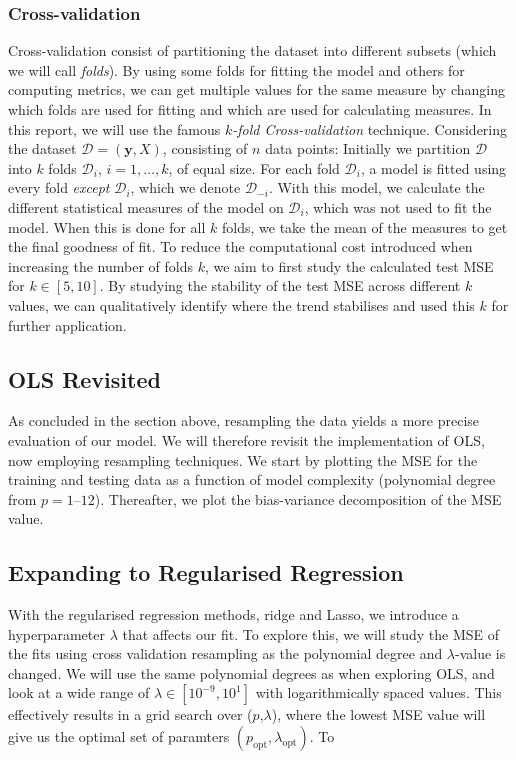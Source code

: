 \documentclass[twocolumn,english,notitlepage]{article}
\renewcommand{\vec}[1]{\boldsymbol{#1}}
\newcommand{\msub}[2]{\ensuremath{{#1}_\text{#2}}}
\begin{document}
        \subsubsection*{Cross-validation}
            Cross-validation consist of partitioning the dataset into different subsets (which we will call \textit{folds}). By using some folds for fitting the model and others for computing metrics, we can get multiple values for the same measure by changing which folds are used for fitting and which are used for calculating measures. 
            \newline\newline
            In this report, we will use the famous \textit{$k$-fold Cross-validation} technique. Considering the dataset $\mathcal{D} = (\vec{y}, X)$, consisting of $n$ data points: Initially we partition $\mathcal{D}$ into $k$ folds $\mathcal{D}_i$, $i = 1, \ldots , k$, of equal size. For each fold $\mathcal{D}_i$, a model is fitted using every fold \textit{except} $\mathcal{D}_i$, which we denote $\mathcal{D}_{-i}$. With this model, we calculate the different statistical measures of the model on $\mathcal{D}_i$, which was not used to fit the model. When this is done for all $k$ folds, we take the mean of the measures to get the final goodness of fit. 
            \newline\newline
            To reduce the computational cost introduced when increasing the number of folds $k$, we aim to first study the calculated test MSE for $k \in [5,10]$. By studying the stability of the test MSE across different $k$ values, we can qualitatively identify where the trend stabilises and used this $k$ for further application.   

    \subsection{OLS Revisited}
        As concluded in the section above, resampling the data yields a more precise evaluation of our model. We will therefore revisit the implementation of OLS, now employing resampling techniques. We start by plotting the MSE for the training and testing data as a function of model complexity (polynomial degree from $p=1\text{--}12$). Thereafter, we plot the bias-variance decomposition of the MSE value.  


    
    \subsection{Expanding to Regularised Regression}
        With the regularised regression methods, ridge and Lasso, we introduce a hyperparameter $\lambda$ that affects our fit. To explore this, we will study the MSE of the fits using cross validation resampling as the polynomial degree and $\lambda$-value is changed. We will use the same polynomial degrees as when exploring OLS, and look at a wide range of $\lambda \in [10^{-9}, 10^1]$ with logarithmically spaced values. This effectively results in a grid search over ($p$,$\lambda$), where the lowest MSE value will give us the optimal set of paramters $(\msub{p}{opt}, \msub{\lambda}{opt})$. To 
\end{document}
